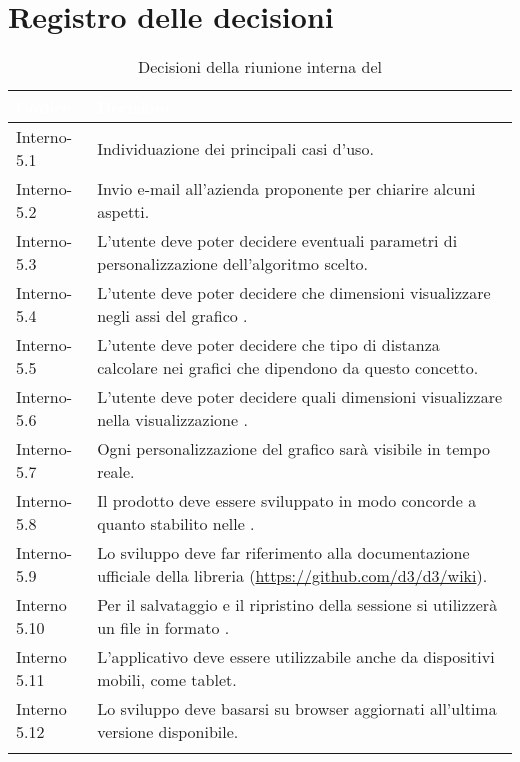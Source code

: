 \section{Registro delle decisioni}
{
\renewcommand{\arraystretch}{1.5}
\centering
\begin{longtable}{C{3cm} C{10cm}}
\textcolor{white}{\textbf{Codice}}&
\textcolor{white}{\textbf{Decisione}}\\	
\endhead
		
Interno-5.1 & Individuazione dei principali casi d'uso.\\
Interno-5.2 & Invio e-mail all'azienda proponente per chiarire alcuni aspetti.\\

Interno-5.3 & L'utente deve poter decidere eventuali parametri di personalizzazione dell'algoritmo scelto.\\

Interno-5.4 & L'utente deve poter decidere che dimensioni visualizzare negli assi del grafico .\\

Interno-5.5 & L'utente deve poter decidere che tipo di distanza calcolare nei grafici che dipendono da questo concetto.\\

Interno-5.6 & L'utente deve poter decidere quali dimensioni visualizzare nella visualizzazione .\\

Interno-5.7 & Ogni personalizzazione del grafico sarà visibile in tempo reale.\\

Interno-5.8 & Il prodotto deve essere sviluppato in modo concorde a quanto stabilito nelle \NdPv{}.\\

Interno-5.9 & Lo sviluppo deve far riferimento alla documentazione ufficiale della libreria  (\textcolor{blue}{\url{https://github.com/d3/d3/wiki}}). \\

Interno 5.10 & Per il salvataggio e il ripristino della sessione si utilizzerà un file in formato .\\

Interno 5.11 & L'applicativo deve essere utilizzabile anche da dispositivi mobili, come tablet.\\

Interno 5.12 & Lo sviluppo deve basarsi su browser aggiornati all'ultima versione disponibile.\\

\caption{Decisioni della riunione interna del \Data{}}
		
\end{longtable}
}

